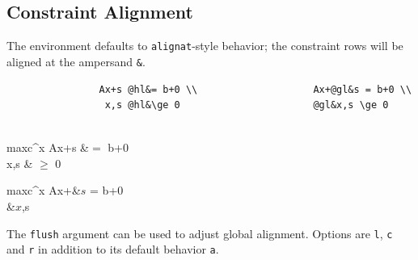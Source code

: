 \documentclass{article}
\newcommand{\hl}[1]{\colorbox{SeaGreen!30}{#1}}
\newcommand{\gl}[1]{\colorbox{Thistle!30}{#1}}
\begin{document}
\subsection*{Constraint Alignment}
The environment defaults to \verb|alignat|-style behavior; the constraint rows will be aligned at the ampersand \verb|&|.
\begin{tcolorbox}
	\begin{Verbatim}
				Ax+s @hl&= b+0 \\   		 		 Ax+@gl&s = b+0 \\
				 x,s @hl&\ge 0     			 	     @gl&x,s \ge 0
				 
	\end{Verbatim}
\tcblower
\hfill
\begin{minipage}{0.4\textwidth}
	\begin{lpalign*}{max}{c^\top x}
	  Ax+s &\hl{$=$} b+0 \\
	  x,s & \hl{$\ge$} 0 
	\end{lpalign*} 
\end{minipage}
\begin{minipage}{0.5\textwidth}
	\begin{lpalign*}{max}{c^\top x}
    Ax+&\gl{$s$} = b+0 \\
       &\gl{$x$},s  
  \end{lpalign*} 

\end{minipage}
\end{tcolorbox}

The \verb|flush| argument can be used to adjust global alignment. Options are \verb|l|, \verb|c| and \verb|r| in addition to its default behavior \verb|a|.
\end{document}
